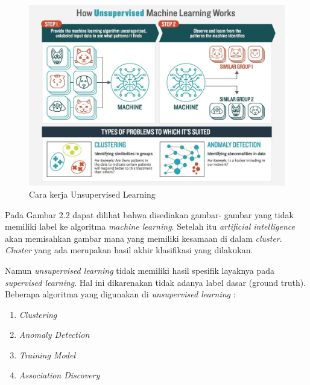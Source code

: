 \begin{figure}[h!]
	\centering
	\includegraphics[scale=0.18]{img/unsupervised.jpg}
	\caption{Cara kerja Unsupervised Learning \cite{cit:8}}
	\label{fig:Unsupervised}
\end{figure}

\pagebreak

\par Pada Gambar 2.2 dapat dilihat bahwa disediakan gambar- gambar yang tidak memiliki label ke algoritma \textit{machine learning}. Setelah itu \textit{artificial intelligence} akan memisahkan gambar mana yang memiliki kesamaan di dalam \textit{cluster}. \textit{Cluster} yang ada merupakan hasil akhir klasifikasi yang dilakukan.

\par Namun \textit{unsupervised learning} tidak memiliki hasil spesifik layaknya pada \textit{supervised learning}. Hal ini dikarenakan tidak adanya label dasar (ground truth). Beberapa algoritma yang digunakan di \textit{unsupervised learning} :
\begin{enumerate}
	\vspace{-2mm}
	\item \textit{Clustering}
	\vspace{-2mm}
	\item \textit{Anomaly Detection}
	\vspace{-2mm}
	\item \textit{Training Model}
	\vspace{-2mm}
	\item \textit{Association Discovery}
\end{enumerate}

\vspace{1ex}

